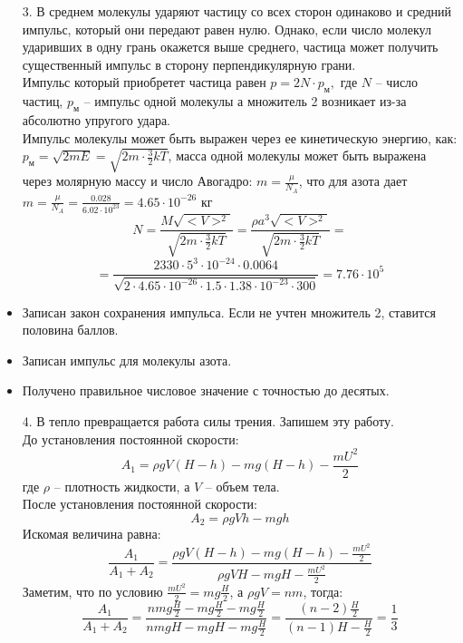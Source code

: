 \documentclass[a4paper, 12pt, oneside]{book}
\begin{document}
\begin{enumerate}
\item[3.] В среднем молекулы ударяют частицу со всех сторон одинаково и средний импульс, который они передают равен нулю. Однако, если число молекул ударивших в одну грань окажется выше среднего, частица может получить существенный импульс в сторону перпендикулярную грани.\\
Импульс который приобретет частица равен $p=2N\cdot p_\text{м},$ где $N$ – число частиц, $p_\text{м}$ – импульс одной молекулы а множитель 2 возникает из-за абсолютно упругого удара.\\
Импульс молекулы может быть выражен через ее кинетическую энергию, как:\\
$p_\text{м}=\sqrt{2mE}=\sqrt{2m\cdot\frac{3}{2}kT}$, масса одной молекулы может быть выражена через молярную массу и число Авогадро: $m=\frac{\mu}{N_A}$, что для азота дает $m=\frac{\mu}{N_A}=\frac{0.028}{6.02\cdot10^{23}}=4.65\cdot10^{-26}$ кг
$$N=\frac{M\sqrt{<V>^2}}{\sqrt{2m\cdot\frac{3}{2}kT}}=\frac{\rho a^3\sqrt{<V>^2}}{\sqrt{2m\cdot\frac{3}{2}kT}}=$$
$$=\frac{2330\cdot5^3\cdot10^{-24}\cdot0.0064}{\sqrt{2\cdot4.65\cdot10^{-26}\cdot1.5\cdot1.38\cdot10^{-23}\cdot300}}=7.76\cdot10^5$$
\end{enumerate}
\begin{itemize}
\item Записан закон сохранения импульса. Если не учтен множитель 2, ставится половина баллов.
\item Записан импульс для молекулы азота.
\item Получено правильное числовое значение с точностью до десятых.
\end{itemize}
\begin{enumerate}
\item[4.] В тепло превращается работа силы трения. Запишем эту работу.\\
До установления постоянной скорости:
$$A_1=\rho gV(H-h)-mg(H-h)-\frac{mU^2}{2}$$
где $\rho$ – плотность жидкости, а $V$ – объем тела.\\
После установления постоянной скорости:
$$A_2=\rho gVh-mgh$$
Искомая величина равна:
$$\frac{A_1}{A_1+A_2}=\frac{\rho gV(H-h)-mg(H-h)-\frac{mU^2}{2}}{\rho gVH-mgH-\frac{mU^2}{2}}$$
Заметим, что по условию $\frac{mU^2}{2}=mg\frac{H}{2}$, а $\rho gV=nm$, тогда:
$$\frac{A_1}{A_1+A_2}=\frac{nmg\frac{H}{2}-mg\frac{H}{2}-mg\frac{H}{2}}{nmgH-mgH-mg\frac{H}{2}}=\frac{(n-2)\frac{H}{2}}{(n-1)H-\frac{H}{2}}=\frac{1}{3}$$
\end{enumerate}
\end{document}
